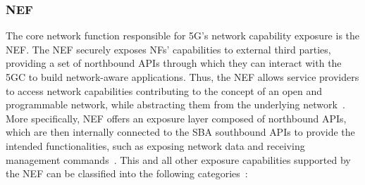 \subsubsection{\acl{NEF}} \label{sec:sba:nef}

The core network function responsible for \acs{5G}'s network capability exposure is the \acs{NEF}. The \acs{NEF} securely exposes \acsp{NF}' capabilities to external third parties, providing a set of northbound \acsp{API} through which they can interact with the \ac{5GC} to build network-aware applications. Thus, the \acs{NEF} allows service providers to access network capabilities contributing to the concept of an open and programmable network, while abstracting them from the underlying network~\cite{NEFsim}. More specifically, \acs{NEF} offers an exposure layer composed of northbound \acsp{API}, which are then internally connected to the \acs{SBA} southbound \acsp{API} to provide the intended functionalities, such as exposing network data and receiving management commands~\cite{CAPIFmicroserviceVerticals}. This and all other exposure capabilities supported by the \acs{NEF} can be classified into the following categories~\cite{ETSI_TS_123_501_V16_9_0}:
